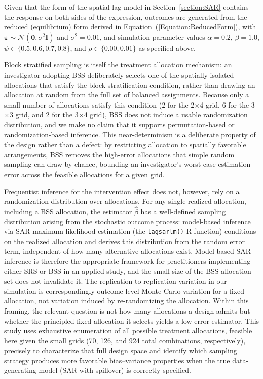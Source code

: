 \documentclass{article}[11pt]
\begin{document}
Given that the form of the spatial lag model in Section~\ref{section:SAR} contains the response on both sides of the expression, outcomes are generated from the reduced (equilibrium) form derived in Equation~(\ref{Equation:ReducedForm})\cite{fotheringham_sage_2009}\cite{baltagi_spatial_2003}, with $\boldsymbol\varepsilon \sim \mathcal{N}(\mathbf{0}, \sigma^2\mathbf{I})$ and $\sigma^2 = 0.01$, and simulation parameter values $\alpha = 0.2$, $\beta = 1.0$, $\psi \in \{0.5, 0.6, 0.7, 0.8\}$, and $\rho \in \{0.00, 0.01\}$ as specified above.


Block stratified sampling is itself the treatment allocation mechanism: an investigator adopting BSS deliberately selects one of the spatially isolated allocations that satisfy the block stratification condition, rather than drawing an allocation at random from the full set of balanced assignments. Because only a small number of allocations satisfy this condition (2 for the 2$\times$4 grid, 6 for the 3$\times$3 grid, and 2 for the 3$\times$4 grid), BSS does not induce a usable randomization distribution, and we make no claim that it supports permutation-based or randomization-based inference. This near-determinism is a deliberate property of the design rather than a defect: by restricting allocation to spatially favorable arrangements, BSS removes the high-error allocations that simple random sampling can draw by chance, bounding an investigator's worst-case estimation error across the feasible allocations for a given grid.

Frequentist inference for the intervention effect does not, however, rely on a randomization distribution over allocations. For any single realized allocation, including a BSS allocation, the estimator $\hat{\beta}$ has a well-defined sampling distribution arising from the stochastic outcome process: model-based inference via SAR maximum likelihood estimation (the \texttt{lagsarlm()} R function) conditions on the realized allocation and derives this distribution from the random error term, independent of how many alternative allocations exist. Model-based SAR inference is therefore the appropriate framework for practitioners implementing either SRS or BSS in an applied study, and the small size of the BSS allocation set does not invalidate it. The replication-to-replication variation in our simulation is correspondingly outcome-level Monte Carlo variation for a fixed allocation, not variation induced by re-randomizing the allocation. Within this framing, the relevant question is not how many allocations a design admits but whether the principled fixed allocation it selects yields a low-error estimator. This study uses exhaustive enumeration of all possible treatment allocations, feasible here given the small grids (70, 126, and 924 total combinations, respectively), precisely to characterize that full design space and identify which sampling strategy produces more favorable bias--variance properties when the true data-generating model (SAR with spillover) is correctly specified.
\end{document}
